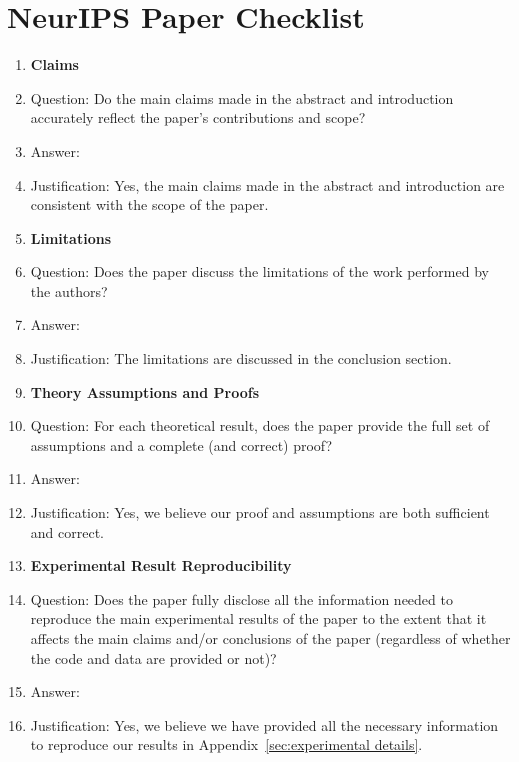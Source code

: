 \documentclass[nohyperref]{article}
\theoremstyle{plain}
\theoremstyle{remark}
\begin{document}
\section*{NeurIPS Paper Checklist}
\begin{enumerate}
\item {\bf Claims}
    \item[] Question: Do the main claims made in the abstract and introduction accurately reflect the paper's contributions and scope?
    \item[] Answer: \answerYes{} %
    \item[] Justification: Yes, the main claims made in the abstract and introduction are consistent with the scope of the paper.

\item {\bf Limitations}
    \item[] Question: Does the paper discuss the limitations of the work performed by the authors?
    \item[] Answer: \answerYes{} %
    \item[] Justification: The limitations are discussed in the conclusion section.
 

\item {\bf Theory Assumptions and Proofs}
    \item[] Question: For each theoretical result, does the paper provide the full set of assumptions and a complete (and correct) proof?
    \item[] Answer: \answerYes{} %
    \item[] Justification: Yes, we believe our proof and assumptions are both sufficient and correct.


    \item {\bf Experimental Result Reproducibility}
    \item[] Question: Does the paper fully disclose all the information needed to reproduce the main experimental results of the paper to the extent that it affects the main claims and/or conclusions of the paper (regardless of whether the code and data are provided or not)?
    \item[] Answer: \answerYes{} %
    \item[] Justification: Yes, we believe we have provided all the necessary information to reproduce our results in Appendix~\ref{sec:experimental details}.



\end{enumerate}
\end{document}

